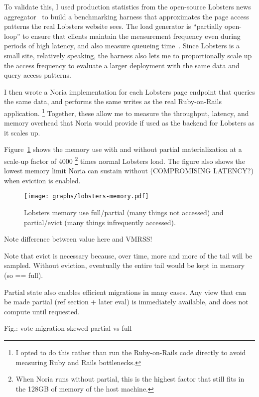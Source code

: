 To validate this, I used production statistics from the open-source Lobsters
news aggregator~\cite{lobsters,lobsters-data} to build a benchmarking harness
that approximates the page access patterns the real Lobsters website sees. The
load generator is ``partially open-loop'' to ensure that clients maintain the
measurement frequency even during periods of high latency, and also measure
queueing time~\cite{frank-open-loop,open-loop-cautionary-tale}. Since Lobsters
is a small site, relatively speaking, the harness also lets me to proportionally
scale up the access frequency to evaluate a larger deployment with the same
data and query access patterns.

I then wrote a Noria implementation for each Lobsters page endpoint that
queries the same data, and performs the same writes as the real Ruby-on-Rails
application.%
\footnote{I opted to do this rather than run the Ruby-on-Rails code directly to
avoid measuring Ruby and Rails bottlenecks.}
Together, these allow me to measure the throughput, latency, and memory overhead
that Noria would provide if used as the backend for Lobsters as it scales up.

Figure~\ref{f:lobsters-memory} shows the memory use with and without partial
materialization at a scale-up factor of 4000%
\footnote{When Noria runs without partial, this is the highest factor that still
fits in the 128GB of memory of the host machine.}
times normal Lobsters load. The figure also shows the lowest memory limit Noria
can sustain without (COMPROMISING LATENCY?) when eviction is enabled.

\begin{figure}[t]
  \centering
  \texttt{[image: graphs/lobsters-memory.pdf]}
  \caption{Lobsters memory use full/partial (many things not accessed) and partial/evict (many things infrequently accessed).}
  \label{f:lobsters-memory}
\end{figure}

Note difference between value here and VMRSS!

Note that evict is necessary because, over time, more and more of the
tail will be sampled. Without eviction, eventually the entire tail would
be kept in memory (so == full).

Partial state also enables efficient migrations in many cases. Any view
that can be made partial (ref section + later eval) is immediately
available, and does not compute until requested.

Fig.: vote-migration skewed partial vs full

